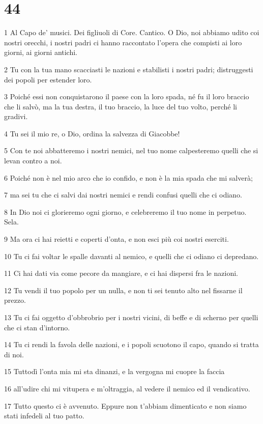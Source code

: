 \chapter{44}

\par 1 Al Capo de' musici. Dei figliuoli di Core. Cantico. O Dio, noi abbiamo udito coi nostri orecchi, i nostri padri ci hanno raccontato l'opera che compisti ai loro giorni, ai giorni antichi.
\par 2 Tu con la tua mano scacciasti le nazioni e stabilisti i nostri padri; distruggesti dei popoli per estender loro.
\par 3 Poiché essi non conquistarono il paese con la loro spada, né fu il loro braccio che li salvò, ma la tua destra, il tuo braccio, la luce del tuo volto, perché li gradivi.
\par 4 Tu sei il mio re, o Dio, ordina la salvezza di Giacobbe!
\par 5 Con te noi abbatteremo i nostri nemici, nel tuo nome calpesteremo quelli che si levan contro a noi.
\par 6 Poiché non è nel mio arco che io confido, e non è la mia spada che mi salverà;
\par 7 ma sei tu che ci salvi dai nostri nemici e rendi confusi quelli che ci odiano.
\par 8 In Dio noi ci glorieremo ogni giorno, e celebreremo il tuo nome in perpetuo. Sela.
\par 9 Ma ora ci hai reietti e coperti d'onta, e non esci più coi nostri eserciti.
\par 10 Tu ci fai voltar le spalle davanti al nemico, e quelli che ci odiano ci depredano.
\par 11 Ci hai dati via come pecore da mangiare, e ci hai dispersi fra le nazioni.
\par 12 Tu vendi il tuo popolo per un nulla, e non ti sei tenuto alto nel fissarne il prezzo.
\par 13 Tu ci fai oggetto d'obbrobrio per i nostri vicini, di beffe e di scherno per quelli che ci stan d'intorno.
\par 14 Tu ci rendi la favola delle nazioni, e i popoli scuotono il capo, quando si tratta di noi.
\par 15 Tuttodì l'onta mia mi sta dinanzi, e la vergogna mi cuopre la faccia
\par 16 all'udire chi mi vitupera e m'oltraggia, al vedere il nemico ed il vendicativo.
\par 17 Tutto questo ci è avvenuto. Eppure non t'abbiam dimenticato e non siamo stati infedeli al tuo patto.
